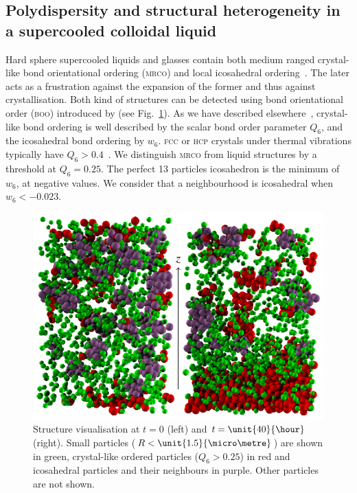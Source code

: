 \documentclass[8.5pt,twoside,twocolumn]{article}
\begin{document}
\subsection{Polydispersity and structural heterogeneity in a supercooled colloidal liquid}


Hard sphere supercooled liquids and glasses contain both medium ranged crystal-like bond orientational ordering (\textsc{mrco}) and local icosahedral ordering~\cite{Leocmach2012}. The later acts as a frustration against the expansion of the former and thus against crystallisation. Both kind of structures can be detected using bond orientational order (\textsc{boo}) introduced by \citet{steinhardt1983boo} (see Fig.~\ref{fig:mrco_ico_small}). As we have described elsewhere~\cite{Leocmach2012}, crystal-like bond ordering is well described by the scalar bond order parameter $Q_6$, and the icosahedral bond ordering by $w_6$. \textsc{fcc} or \textsc{hcp} crystals under thermal vibrations typically have $Q_6>0.4$~\cite{Lechner2008}. We distinguish \textsc{mrco} from liquid structures by a threshold at $Q_6=0.25$. The perfect 13 particles icosahedron is the minimum of $w_6$, at negative values. We consider that a neighbourhood is icosahedral when $w_6<-0.023$.

\begin{figure}[h]
	\centering
	\includegraphics{fig_mrco_ico_small.pdf}
	\caption{Structure visualisation at $t=0$ (left) and $t=\unit{40}{\hour}$ (right). Small particles ($R<\unit{1.5}{\micro\metre}$) are shown in green, crystal-like ordered particles ($Q_6>0.25$) in red and icosahedral particles and their neighbours in purple. Other particles are not shown.}
	\label{fig:mrco_ico_small}
\end{figure}
\end{document}
